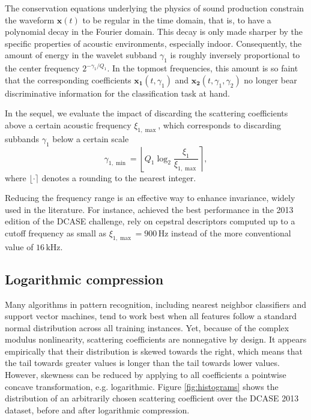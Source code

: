 \documentclass[journal]{IEEEtran}
\makeatletter
\newcommand*{\eg}{e.g.\@\xspace}
\makeatother
\begin{document}
The conservation equations underlying the physics of sound production constrain the waveform $\boldsymbol{x}(t)$ to be regular in the time domain, that is, to have a polynomial decay in the Fourier domain.
This decay is only made sharper by the specific properties of acoustic environments, especially indoor.
Consequently, the amount of energy in the wavelet subband $\gamma_1$ is roughly inversely proportional to the center frequency $2^{-\gamma_1/Q_1}$.
In the topmost frequencies, this amount is so faint that the corresponding coefficients $\boldsymbol{x_1}(t,\gamma_1)$ and $\boldsymbol{x_2}(t,\gamma_1,\gamma_2)$ no longer bear discriminative information for the classification task at hand.

In the sequel, we evaluate the impact of discarding the scattering coefficients above a certain acoustic frequency $\xi_{1,\max}$, which corresponds to discarding subbands $\gamma_1$ below a certain scale
\begin{equation}
\gamma_{1,\min} =
\left\lfloor Q_1 \log_2 \frac{\xi_1}{\xi_{1,\max}} \right\rceil,
\end{equation}
where $\lfloor \cdot \rceil$ denotes a rounding to the nearest integer.

Reducing the frequency range is an effective way to enhance invariance, widely used in the literature.
For instance, \cite{roma2013} achieved the best performance in the 2013 edition of the DCASE challenge, rely on cepstral descriptors computed up to a cutoff frequency as small as $\xi_{1,\max}  = 900\,\mathrm{Hz}$ instead of the more conventional value of $16\,\mathrm{kHz}$.
 
\subsection{Logarithmic compression}
\label{sec:logcomp}

Many algorithms in pattern recognition, including nearest neighbor classifiers and support vector machines, tend to work best when all features follow a standard normal distribution across all training instances.
Yet, because of the complex modulus nonlinearity, scattering coefficients are nonnegative by design.
It appears empirically that their distribution is skewed towards the right, which means that the tail towards greater values is longer than the tail towards lower values.
However, skewness can be reduced by applying to all coefficients a pointwise concave transformation, \eg logarithmic.
Figure \ref{fig:histograms} shows the distribution of an arbitrarily chosen scattering coefficient over the DCASE 2013 dataset, before and after logarithmic compression.
\end{document}
